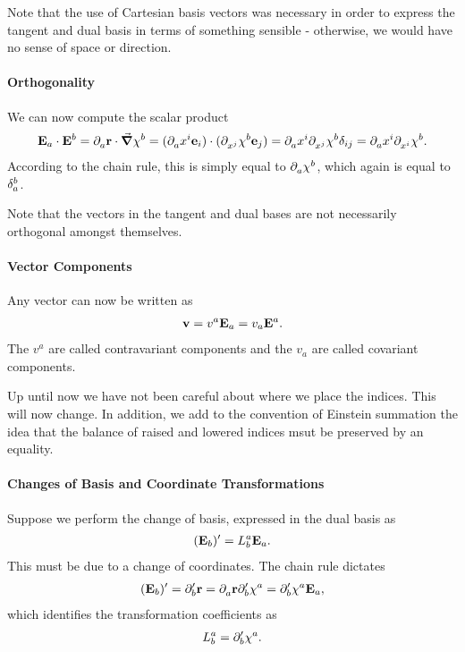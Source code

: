 Note that the use of Cartesian basis vectors was necessary in order to express the tangent and dual basis in terms of something sensible - otherwise, we would have no sense of space or direction.

\paragraph{Orthogonality}
We can now compute the scalar product
\begin{align*}
	\vb{E}_{a}\cdot\vb{E}^{b} = \del{a}{\vb{r}}\cdot\grad{\chi^{b}} = (\del{a}{x^{i}}\vb{e}_{i})\cdot(\del{x^{j}}{\chi^{b}}\vb{e}_{j}) = \del{a}{x^{i}}\del{x^{j}}{\chi^{b}}\delta_{ij} = \del{a}{x^{i}}\del{x^{i}}{\chi^{b}}.
\end{align*}
According to the chain rule, this is simply equal to $\del{a}{\chi^{b}}$, which again is equal to $\kdelta{a}{b}$.

Note that the vectors in the tangent and dual bases are not necessarily orthogonal amongst themselves.

\paragraph{Vector Components}
Any vector can now be written as
\begin{align*}
	\vb{v} = v^{a}\tb{a} = v_{a}\db{a}.
\end{align*}
The $v^{a}$ are called contravariant components and the $v_{a}$ are called covariant components.

Up until now we have not been careful about where we place the indices. This will now change. In addition, we add to the convention of Einstein summation the idea that the balance of raised and lowered indices msut be preserved by an equality.

\paragraph{Changes of Basis and Coordinate Transformations}
Suppose we perform the change of basis, expressed in the dual basis as
\begin{align*}
	(\tb{b})' = L_{b}^{a}\tb{a}.
\end{align*}
This must be due to a change of coordinates. The chain rule dictates
\begin{align*}
	(\tb{b})' = \del[\prime]{b}{\vb{r}} = \del{a}{\vb{r}}\del[\prime]{b}{\chi^{a}} = \del[\prime]{b}{\chi^{a}}\tb{a},
\end{align*}
which identifies the transformation coefficients as
\begin{align*}
	L_{b}^{a} = \del[\prime]{b}{\chi^{a}}.
\end{align*}

